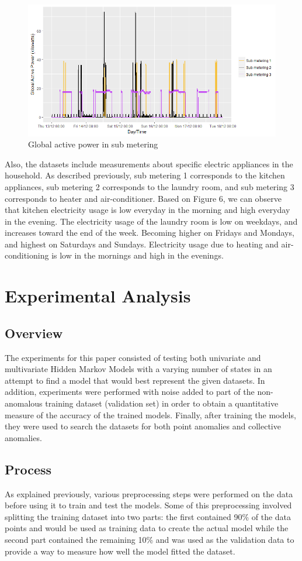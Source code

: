 \documentclass[letterpaper, 11pt]{article}%
\begin{document}
\begin{figure}[H]
  \centering
  \includegraphics[scale=0.4]{fig5}
  \caption{Global active power in sub metering}
\end{figure}
Also, the datasets include measurements about specific electric appliances in the household. As described previously, sub metering 1 corresponds to the kitchen appliances, sub metering 2 corresponds to the laundry room, and sub metering 3 corresponds to heater and air-conditioner. Based on Figure 6, we can observe that kitchen electricity usage is low everyday in the morning and high everyday in the evening. The electricity usage of the laundry room is low on weekdays, and increases toward the end of the week. Becoming higher on Fridays and Mondays, and highest on Saturdays and Sundays. Electricity usage due to heating and air-conditioning is low in the mornings and high in the evenings.

\section{Experimental Analysis}
\subsection{Overview}
The experiments for this paper consisted of testing both univariate and multivariate Hidden Markov Models with a varying number of states in an attempt to find a model that would best represent the given datasets. In addition, experiments were performed with noise added to part of the non-anomalous training dataset (validation set) in order to obtain a quantitative measure of the accuracy of the trained models. Finally, after training the models, they were used to search the datasets for both point anomalies and collective anomalies.

\subsection{Process}
As explained previously, various preprocessing steps were performed on the data before using it to train and test the models. Some of this preprocessing involved splitting the training dataset into two parts: the first contained 90\% of the data points and would be used as training data to create the actual model while the second part contained the remaining 10\% and was used as the validation data to provide a way to measure how well the model fitted the dataset.
\end{document}
